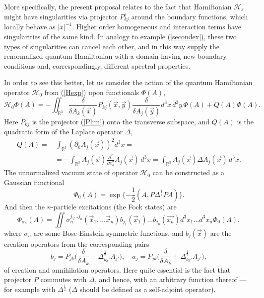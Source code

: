 \documentclass[12pt]{article}
\newcommand{\pl}{\partial}
\newcommand{\HH}{\mathscr{H}}
\newcommand{\RR}{\mathbb{R}}
\newcommand{\ve}{\varepsilon}
\begin{document}
    More specifically, the present proposal relates to the fact that    
    Hamiltonian
$ \HH_{\ve} $
	might have singularities via projector
$ P_{kj}^{\ve} $
    around the boundary functions,
	which locally behave as
$ |x|^{-1} $.
	Higher order homogeneous and interaction terms have singularities
    of the same kind.
	In analogy to example
(\ref{secondex}),
	these two types of singularities can cancel each other,
	and in this way supply the renormalized quantum Hamiltonian
	with a domain having new boundary conditions and, correspondingly,
	different spectral properties.

	In order to see this better, let us consider the action
	of the quantum Hamiltonian operator
$ \HH_{0} $ from
(\ref{Hexp})
	upon functionals
$ \Phi(A) $,
\begin{equation}
\label{qH0}
    \HH_{0}\Phi(A) = - \iint_{\RR^{3}} \frac{\delta}{\delta A_{k}(\vec{x})}
	P_{kj}(\vec{x},\vec{y}) \frac{\delta}{\delta A_{j}(\vec{y})}
	    d^{3}x \,d^{3}y \, \Phi(A)
	+ Q(A) \Phi(A) .
\end{equation}
	Here
$ P_{kj} $
	is the projector
(\ref{Plim})
	onto the transverse subspace, and
$ Q(A) $
	is the quadratic form of the Laplace operator
$ \Delta $,
\begin{align}
\label{QA}
    Q(A) =&\, \int_{\RR^{3}} (\pl_{k}A_{j}(\vec{x}))^{2} d^{3}x = \\
\label{QA1}
	&= - \int_{\RR^{3}} A_{j}(\vec{x}) \frac{\pl^{2}}{\pl x_{k}^{2}}
	A_{j}(\vec{x})\, d^{3} x 
	= \int_{\RR^{3}} A_{j}(\vec{x}) \Delta A_{j}(\vec{x}) \, d^{3}x .
\end{align}
    The unnormalized vacuum state of operator
$ \HH_{0} $
    can be constructed as a Gaussian functional
\begin{equation}
\label{Phi0}
    \Phi_{0}(A) = \exp\{-\frac{1}{2}(A,P\Delta^{\frac{1}{2}}PA)\} .
\end{equation}
    And then the
$ n $-particle excitations (the Fock states)
    are
\begin{equation*}
    \Phi_{\sigma_{n}}(A) = \iint
    \sigma_{n}^{j_{1}\ldots j_{n}} (\vec{x}_{1},\ldots \vec{x}_{n})
	b_{j_{1}}(\vec{x}_{1}) \ldots b_{j_{n}}(\vec{x_{n}})
    d^{3}x_{1} \ldots d^{3}x_{n} \Phi_{0}(A) ,
\end{equation*}
	where
$ \sigma_{n} $ are some Bose-Einstein symmetric functions, and
$ b_{j}(\vec{x}) $ are the creation operators from the corresponding pairs
\begin{equation*}
    b_{j} = P_{jk}\bigl(\frac{\delta}{\delta A_{k}}
	- \Delta^{\frac{1}{2}}_{kj'}A_{j'}\bigr) ,\quad
    a_{j} = P_{jk}\bigl(\frac{\delta}{\delta A_{k}}
	+ \Delta^{\frac{1}{2}}_{kj'} A_{j'} \bigr) ,
\end{equation*}
    	of creation and annihilation operators.
	Here quite essential is the fact that projector
$ P $
	commutes with
$ \Delta $,
	and hence, with an arbitrary function thereof ---
	for example with 
$ \Delta^{\frac{1}{2}} $
($ \Delta $ should be defined as a self-adjoint operator).
\end{document}
